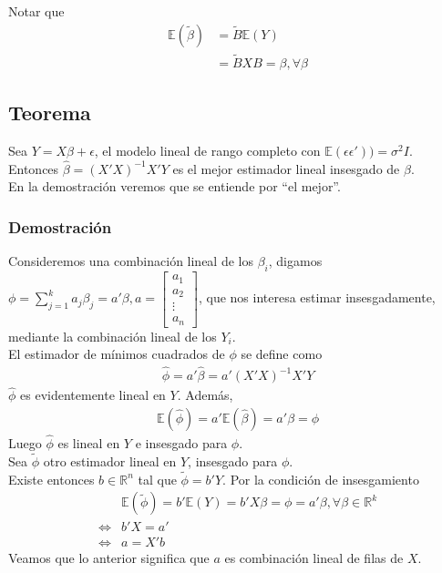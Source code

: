 \documentclass[10pt]{article}
\theoremstyle{plain}
\theoremstyle{definition}
\begin{document}
Notar que
\begin{align*}
\mathbb{E}(\tilde{\beta})&= \tilde{B}\mathbb{E}(Y)\\
&= \tilde{B}XB = \beta, \forall \beta
\end{align*}

\subsection{Teorema}
Sea $Y=X\beta + \epsilon$, el modelo lineal de rango completo con $\mathbb{E}(\epsilon\epsilon')) = \sigma^2 I$.\\
Entonces $\hat{\beta} = (X'X)^{-1}X'Y$ es el mejor estimador lineal insesgado de $\beta$.\\
En la demostración veremos que se entiende por ``el mejor''.
\subsubsection{Demostración}
Consideremos una combinación lineal de los $\beta_{i}$, digamos $\phi = \sum_{j=1}^{k}a_{j}\beta_{j} = a'\beta, a =\begin{bmatrix}
           a_{1} \\
           a_{2} \\
           \vdots \\
           a_{n}
         \end{bmatrix}$, que nos interesa estimar insesgadamente, mediante la combinación lineal de los $Y_{i}$.\\
         
El estimador de mínimos cuadrados de $\phi$ se define como
\begin{align*}
\hat{\phi} = a'\hat{\beta} = a'(X'X)^{-1}X'Y
\end{align*}
$\hat{\phi}$ es evidentemente lineal en $Y$. Además,
\begin{align*}
\mathbb{E}(\hat{\phi}) = a' \mathbb{E} (\hat{\beta}) = a' \beta = \phi
\end{align*}
Luego $\hat{\phi}$ es lineal en $Y$ e insesgado para $\phi$.\\

Sea $\tilde{\phi}$ otro estimador lineal en $Y$, insesgado para $\phi$.\\
Existe entonces $b\in\mathbb{R}^n$ tal que $\tilde{\phi} = b'Y$. Por la condición de insesgamiento
\begin{align*}
& \mathbb{E}(\tilde{\phi}) = b'\mathbb{E}(Y) = b'X\beta = \phi = a'\beta, \forall \beta \in \mathbb{R}^{k}\\
\Leftrightarrow & b'X = a'\\
\Leftrightarrow & a = X'b
\end{align*}
Veamos que lo anterior significa que $a$ es combinación lineal de filas de $X$.\\
\end{document}
